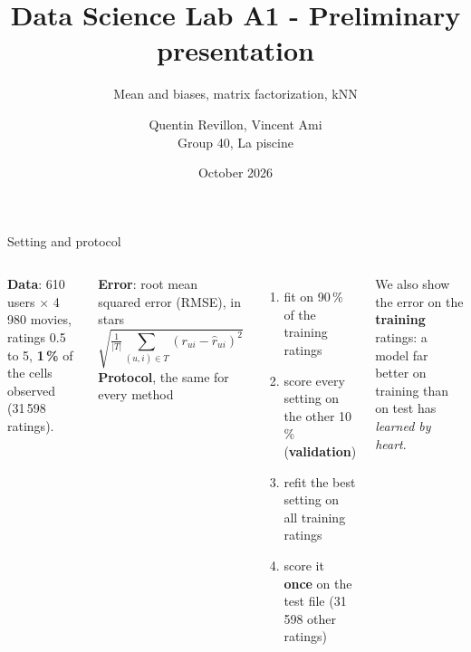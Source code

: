 \documentclass[aspectratio=169,11pt]{beamer}
\title{Data Science Lab A1 - Preliminary presentation}
\subtitle{Mean and biases, matrix factorization, kNN}
\author{Quentin Revillon, Vincent Ami\\[2pt] {\small Group 40, La piscine}}
\institute{DataLab A1, Master IASD}
\date{October 2026}
\newcommand{\key}[1]{\textcolor{accent}{\textbf{#1}}}
\begin{document}
\begin{frame}
\titlepage
\end{frame}

\begin{frame}{Setting and protocol}
\begin{columns}[T]
\textbf{Data}: 610 users $\times$ 4\,980 movies, ratings 0.5 to 5,
\key{1\,\%} of the cells observed (31\,598 ratings).

\vspace{0.6em}
\textbf{Error}: root mean squared error (RMSE), in stars
\[
  \sqrt{\tfrac{1}{|T|}\textstyle\sum_{(u,i)\in T} (r_{ui} - \hat r_{ui})^2}
\]
\textbf{Protocol}, the same for every method
\begin{enumerate}\small
  \item fit on 90\,\% of the training ratings
  \item score every setting on the other 10\,\% (\key{validation})
  \item refit the best setting on all training ratings
  \item score it \key{once} on the test file (31\,598 other ratings)
\end{enumerate}
\vspace{0.3em}
\small We also show the error on the \key{training} ratings: a model far better on
training than on test has \emph{learned by heart}.
\end{columns}
\end{frame}
\end{document}
